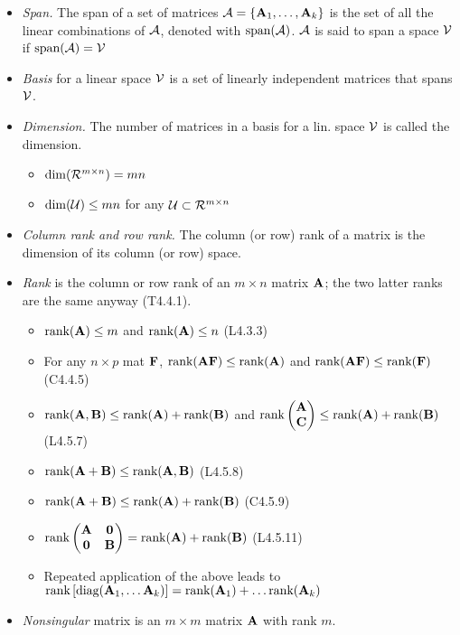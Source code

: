 \documentclass[a4paper, oneside]{book}
\begin{document}
\begin{itemize}
\item \textit{Span.} The span of a set of matrices $\mathcal A = \{\mathbf A_1, \hdots, \mathbf A_k\}$ is the set of all the linear combinations of $\mathcal A$, denoted with $\text{span}(\mathcal A)$. $\mathcal A$ is said to span a space $\mathcal V$ if $\text{span}(\mathcal A) = \mathcal V$
\item \textit{Basis} for a linear space $\mathcal V$ is a set of linearly independent matrices that spans $\mathcal V$.
\item \textit{Dimension.} The number of matrices in a basis for a lin. space $\mathcal V$ is called the dimension. 
	\begin{itemize}
	\item $\dim (\mathcal R^{m\times n}) = mn$
	\item $\dim (\mathcal U) \le mn$ for any $\mathcal U \subset \mathcal R^{m\times n}$
	\end{itemize}
\item \textit{Column rank and row rank.} The column (or row) rank of a matrix is the dimension of its column (or row) space.
\item \textit{Rank} is the column or row rank of an $m\times n$ matrix $\mathbf A$; the two latter ranks are the same anyway (T4.4.1). 
	\begin{itemize}
	\item $\text{rank} (\mathbf A)\le m$ and $\text{rank}(\mathbf A)\le n$ (L4.3.3)
	\item For any $n\times p$ mat $\mathbf F$, $\text{rank}(\mathbf{AF}) \le \text{rank} (\mathbf A)$ and  $\text{rank}(\mathbf{AF}) \le \text{rank} (\mathbf F)$ (C4.4.5)
	\item $\text{rank}(\mathbf{A,B}) \le \text{rank}(\mathbf A) + \text{rank}(\mathbf B)$  and $\text{rank}\left(\begin{matrix} \mathbf A \\ \mathbf C \end{matrix} \right) \le \text{rank}(\mathbf A) + \text{rank}(\mathbf B)$ (L4.5.7)
	\item $\text{rank}(\mathbf A +\mathbf B) \le \text{rank}(\mathbf{A,B})$  (L4.5.8)
	\item $\text{rank}(\mathbf A +\mathbf B) \le \text{rank}(\mathbf A) + \text{rank}(\mathbf B)$  (C4.5.9)
	\item $\text{rank}\left( \begin{matrix}
	\mathbf A & \mathbf 0 \\ \mathbf 0 & \mathbf B
	\end{matrix}\right) = \text{rank}(\mathbf A) + \text{rank}(\mathbf B)$ (L4.5.11)
	\item Repeated application of the above leads to $\text{rank}\left[\text{diag}(\mathbf{A}_1, \hdots \mathbf A_k)\right] = \text{rank}(\mathbf A_1) + \hdots \text{rank}(\mathbf A_k)$
	\end{itemize}
\item \textit{Nonsingular} matrix is an $m \times m$ matrix $\mathbf A$ with rank $m$.
\end{itemize}
\end{document}
